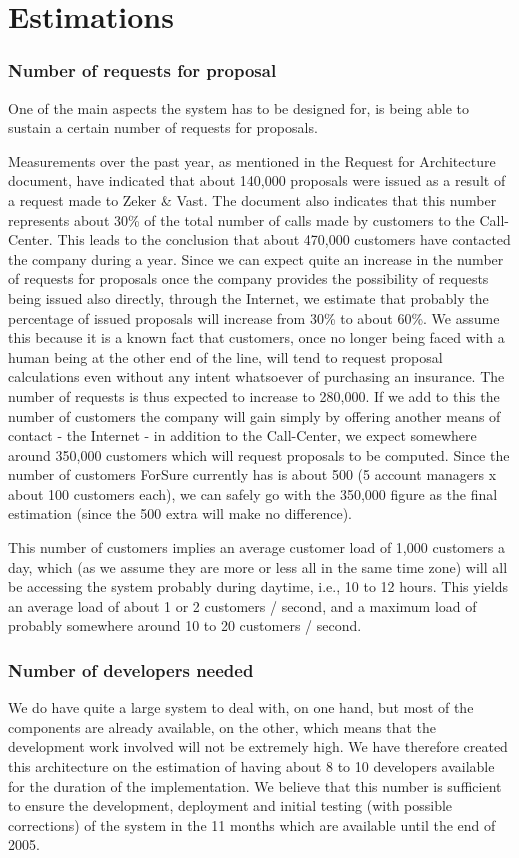 \section{Estimations}

\subsubsection{Number of requests for proposal}

One of the main aspects the system has to be designed for, is being able
to sustain a certain number of requests for proposals.

Measurements over the past year, as mentioned in the Request for
Architecture document, have indicated that about 140,000 proposals
were issued as a result of a request made to Zeker \& Vast. The document
also indicates that this number represents about 30\% of the total
number of calls made by customers to the Call-Center. This leads to the
conclusion that about 470,000 customers have contacted the company
during a year. Since we can expect quite an increase in the number of
requests for proposals once the company provides the possibility of requests
being issued also directly, through the Internet, we estimate that probably
the percentage of issued proposals will increase from 30\% to about 60\%.
We assume this because it is a known fact that customers, once no longer being
faced with a human being at the other end of the line, will tend to request
proposal calculations even without any intent whatsoever of purchasing
an insurance. The number of requests is thus expected to increase to 280,000.
If we add to this the number of customers the company will gain simply
by offering another means of contact - the Internet - in addition to the Call-Center,
we expect somewhere around 350,000 customers which will request proposals
to be computed. Since the number of customers ForSure currently has is about
500 (5 account managers x about 100 customers each), we can safely go
with the 350,000 figure as the final estimation (since the 500 extra will make
no difference).

This number of customers implies an average customer load of 1,000 customers
a day, which (as we assume they are more or less all in the same time zone) will
all be accessing the system probably during daytime, i.e., 10 to 12 hours. This
yields an average load of about 1 or 2 customers / second, and a maximum load
of probably somewhere around 10 to 20 customers / second.

\subsubsection{Number of developers needed}

We do have quite a large system to deal with, on one hand, but most of the
components are already available, on the other, which means that the development
work involved will not be extremely high. We have therefore created this architecture
on the estimation of having about 8 to 10 developers available for the duration
of the implementation. We believe that this number is sufficient to ensure the
development, deployment and initial testing (with possible corrections) of the
system in the 11 months which are available until the end of 2005.